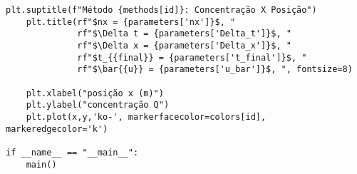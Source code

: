 \begin{Verbatim}[fontsize=\footnotesize]
    plt.suptitle(f"Método {methods[id]}: Concentração X Posição")
    plt.title(rf"$nx = {parameters['nx']}$, "
              rf"$\Delta t = {parameters['Delta_t']}$, "
              rf"$\Delta x = {parameters['Delta_x']}$, "
              rf"$t_{{final}} = {parameters['t_final']}$, "
              rf"$\bar{{u}} = {parameters['u_bar']}$, ", fontsize=8)

    plt.xlabel("posição x (m)")
    plt.ylabel("concentração Q")
    plt.plot(x,y,'ko-', markerfacecolor=colors[id], markeredgecolor='k')

if __name__ == "__main__":
    main()
\end{Verbatim}